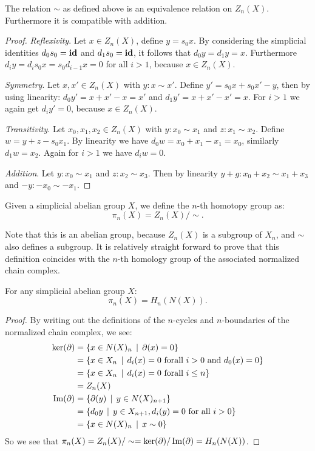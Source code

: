 
\begin{lemma}
	The relation $\sim$ as defined above is an equivalence relation on $Z_n(X)$. Furthermore it is compatible with addition.
\end{lemma}
\begin{proof}
	\emph{Reflexivity}. Let $x \in Z_n(X)$, define $y = s_0 x$. By considering the simplicial identities $d_0 s_0 = \mathbf{id}$ and $d_1 s_0 = \mathbf{id}$, it follows that $d_0 y = d_1 y = x$. Furthermore $d_i y = d_i s_0 x = s_0 d_{i-1} x = 0$ for all $i > 1$, because $x \in Z_n(X)$.

	\emph{Symmetry}. Let $x, x' \in Z_n(X)$ with $y: x \sim x'$. Define $y' = s_0 x + s_0 x' - y$, then by using linearity: $d_0 y' = x + x' - x = x'$ and $d_1 y' = x + x' - x' = x$. For $i>1$ we again get $d_i y' = 0$, because $x \in Z_n(X)$.

	\emph{Transitivity}. Let $x_0, x_1, x_2 \in Z_n(X)$ with $y: x_0 \sim x_1$ and $z: x_1 \sim x_2$. Define $w = y + z - s_0 x_1$. By linearity we have $d_0 w = x_0 + x_1 -x_1 = x_0$, similarly $d_1 w = x_2$. Again for $i>1$ we have $d_i w = 0$.

	\emph{Addition}. Let $y: x_0 \sim x_1$ and $z: x_2 \sim x_3$. Then by linearity $y + g: x_0 + x_2 \sim x_1 + x_3$ and $-y: -x_0 \sim -x_1$.
\end{proof}

\begin{definition}
	Given a simplicial abelian group $X$, we define the $n$-th homotopy group as:
	$$ \pi_n(X) = Z_n(X) / \sim. $$
\end{definition}

Note that this is an abelian group, because $Z_n(X)$ is a subgroup of $X_n$, and $\sim$ also defines a subgroup. It is relatively straight forward to prove that this definition coincides with the $n$-th homology group of the associated normalized chain complex.

\begin{lemma}
	For any simplicial abelian group $X$:
	$$ \pi_n(X) = H_n(N(X)). $$
\end{lemma}
\begin{proof}
	By writing out the definitions of the $n$-cycles and $n$-boundaries of the normalized chain complex, we see:
	\begin{align*}
		\ker(\partial) &= \{ x \in N(X)_n \,\mid\, \partial(x) = 0 \} \\
			&= \{ x \in X_n \,\mid\, d_i(x) = 0 \text{ forall } i > 0 \text{ and } d_0(x) = 0 \} \\
			&= \{ x \in X_n \,\mid\, d_i(x) = 0 \text{ forall } i \leq n \} \\
			&= Z_n(X) \\
		\operatorname{Im}(\partial) &= \{ \partial(y) \,\mid\, y \in N(X)_{n+1} \} \\
			&= \{ d_0 y \,\mid\, y \in X_{n+1}, d_i(y) = 0 \text{ for all } i > 0 \} \\
			&= \{ x \in N(X)_n \,\mid\, x \sim 0 \}
	\end{align*}
	So we see that $\pi_n(X) = Z_n(X) / \sim = \ker(\partial) / \operatorname{Im}(\partial) = H_n(N(X))$.
\end{proof}

